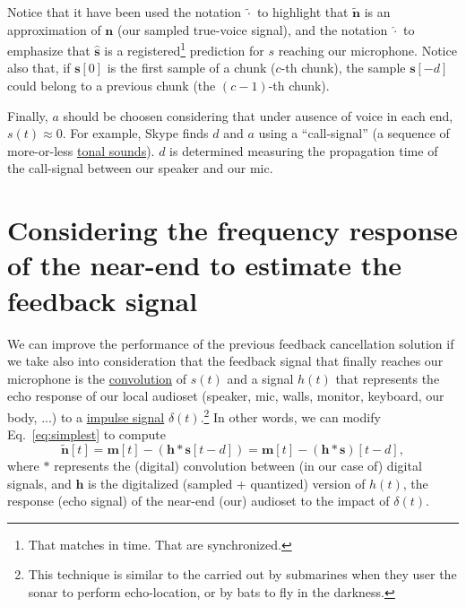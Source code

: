 Notice that it have been used the notation $\tilde{\cdot}$ to
highlight that $\tilde{\mathbf n}$ is an approximation of ${\mathbf
  n}$ (our sampled true-voice signal), and the notation $\hat{\cdot}$
to emphasize that $\hat{\mathbf s}$ is a registered\footnote{That
matches in time. That are synchronized.} prediction for $s$ reaching
our microphone. Notice also that, if ${\mathbf s}[0]$ is the first
sample of a chunk ($c$-th chunk), the sample ${\mathbf s}[-d]$ could
belong to a previous chunk (the $(c-1)$-th chunk).

Finally, $a$ should be choosen considering that under ausence of voice
in each end, $s(t)\approx 0$. For example, Skype finds $d$ and $a$
using a ``call-signal'' (a sequence of more-or-less
\href{https://en.wikipedia.org/wiki/Musical_tone}{tonal sounds}). $d$
is determined measuring the propagation time of the call-signal
between our speaker and our mic.

\section{Considering the frequency response of the near-end to estimate the feedback signal}
We can improve the performance of the previous feedback cancellation
solution if we take also into consideration that the feedback signal
that finally reaches our microphone is the
\href{https://en.wikipedia.org/wiki/Convolution}{convolution} of
$s(t)$ and a signal $h(t)$ that represents the echo response of our
local audioset (speaker, mic, walls, monitor, keyboard, our body, ...)
to a \href{https://en.wikipedia.org/wiki/Impulse_response}{impulse
  signal} $\delta(t)$.\footnote{This technique is similar to the
  carried out by submarines when they user the sonar to perform
  echo-location, or by bats to fly in the darkness.} In other words,
we can modify Eq.~\eqref{eq:simplest} to compute
\begin{equation}
 \tilde{\mathbf{n}}[t] = \mathbf{m}[t] - (\mathbf{h}\ast\mathbf{s}[t-d]) = \mathbf{m}[t] - (\mathbf{h}\ast\mathbf{s})[t-d],
  \label{eq:using_convolution}
\end{equation}
where $\ast$ represents the (digital) convolution between (in our case
of) digital signals, and ${\mathbf h}$ is the digitalized (sampled +
quantized) version of $h(t)$, the response (echo signal) of the near-end
(our) audioset to the impact of $\delta(t)$.

